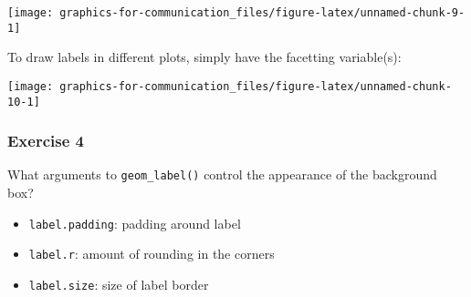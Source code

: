 \documentclass[]{book}
\newenvironment{Shaded}{\begin{snugshade}}{\end{snugshade}}
\newcommand{\DataTypeTok}[1]{\textcolor[rgb]{0.13,0.29,0.53}{#1}}
\newcommand{\DecValTok}[1]{\textcolor[rgb]{0.00,0.00,0.81}{#1}}
\newcommand{\KeywordTok}[1]{\textcolor[rgb]{0.13,0.29,0.53}{\textbf{#1}}}
\newcommand{\NormalTok}[1]{#1}
\newcommand{\OperatorTok}[1]{\textcolor[rgb]{0.81,0.36,0.00}{\textbf{#1}}}
\newcommand{\OtherTok}[1]{\textcolor[rgb]{0.56,0.35,0.01}{#1}}
\newcommand{\StringTok}[1]{\textcolor[rgb]{0.31,0.60,0.02}{#1}}
\providecommand{\tightlist}{%
  \setlength{\itemsep}{0pt}\setlength{\parskip}{0pt}}
\theoremstyle{definition}
\theoremstyle{definition}
\theoremstyle{definition}
\theoremstyle{remark}
\begin{document}
\begin{center}\texttt{[image: graphics-for-communication\_files/figure-latex/unnamed-chunk-9-1]} \end{center}

To draw labels in different plots, simply have the facetting
variable(s):

\begin{Shaded}
\end{Shaded}

\begin{center}\texttt{[image: graphics-for-communication\_files/figure-latex/unnamed-chunk-10-1]} \end{center}

\hypertarget{exercise-4-39}{%
\subsubsection{Exercise 4}\label{exercise-4-39}}

What arguments to \texttt{geom\_label()} control the appearance of the
background box?

\begin{itemize}
\tightlist
\item
  \texttt{label.padding}: padding around label
\item
  \texttt{label.r}: amount of rounding in the corners
\item
  \texttt{label.size}: size of label border
\end{itemize}
\end{document}
